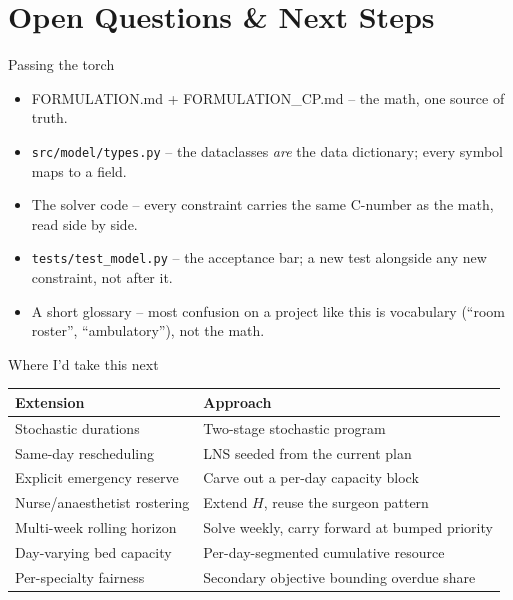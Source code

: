 \documentclass[aspectratio=169]{beamer}
\begin{document}
\section{Open Questions \& Next Steps}

\begin{frame}{Passing the torch}
  \begin{itemize}
    \item FORMULATION.md + FORMULATION\_CP.md -- the math, one source of
      truth.
    \item \texttt{src/model/types.py} -- the dataclasses \emph{are} the
      data dictionary; every symbol maps to a field.
    \item The solver code -- every constraint carries the same C-number as
      the math, read side by side.
    \item \texttt{tests/test\_model.py} -- the acceptance bar; a new test
      alongside any new constraint, not after it.
    \item A short glossary -- most confusion on a project like this is
      vocabulary (``room roster'', ``ambulatory''), not the math.
  \end{itemize}
\end{frame}

\begin{frame}{Where I'd take this next}
  \footnotesize
  \begin{center}
  \begin{tabular}{ll}
    \toprule
    Extension & Approach \\
    \midrule
    Stochastic durations & Two-stage stochastic program \\
    Same-day rescheduling & LNS seeded from the current plan \\
    Explicit emergency reserve & Carve out a per-day capacity block \\
    Nurse/anaesthetist rostering & Extend $H$, reuse the surgeon pattern \\
    Multi-week rolling horizon & Solve weekly, carry forward at bumped priority \\
    Day-varying bed capacity & Per-day-segmented cumulative resource \\
    Per-specialty fairness & Secondary objective bounding overdue share \\
    \bottomrule
  \end{tabular}
  \end{center}
\end{frame}
\end{document}
